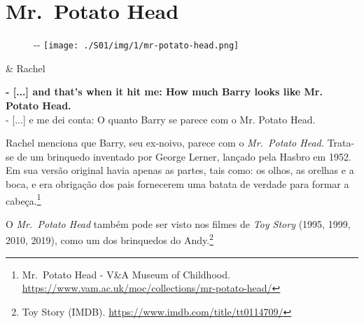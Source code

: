 \hypertarget{mr.-potato-head}{%
\section{Mr.~Potato Head}\label{mr.-potato-head}}

\begin{figure}[!ht]
  \begin{adjustwidth}{-\oddsidemargin-1in}{-\rightmargin}
    \centering
    \texttt{[image: ./S01/img/1/mr-potato-head.png]}
  \end{adjustwidth}
\end{figure}

\begin{tcolorbox}[enhanced,center upper,
    drop fuzzy shadow southeast, boxrule=0.3pt,
    lower separated=false, breakable,
    colframe=black!30!dialogoBorder,colback=white]
\begin{minipage}[c]{0.16\linewidth}
   & \centering \scriptsize{Rachel}
\end{minipage}
\hfill
\begin{minipage}[c]{0.8\linewidth}
  \textbf{- [...] and that's when it hit me: How much Barry looks like Mr. Potato Head.}\\
  - [...] e me dei conta: O quanto Barry se parece com o Mr. Potato Head.
\end{minipage}
\end{tcolorbox}

Rachel menciona que Barry, seu ex-noivo, parece com o \emph{Mr.~Potato
Head.} Trata-se de um brinquedo inventado por George Lerner, lançado
pela Hasbro em 1952. Em sua versão original havia apenas as partes, tais
como: os olhos, as orelhas e a boca, e era obrigação dos pais fornecerem
uma batata de verdade para formar a cabeça.\footnote{\sloppy Mr. Potato Head - V\&A Museum of Childhood. \url{https://www.vam.ac.uk/moc/collections/mr-potato-head/}}

O \emph{Mr.~Potato Head} também pode ser visto nos filmes de \emph{Toy
Story} (1995, 1999, 2010, 2019), como um dos brinquedos do
Andy.\footnote{\sloppy Toy Story (IMDB). \url{https://www.imdb.com/title/tt0114709/}}

